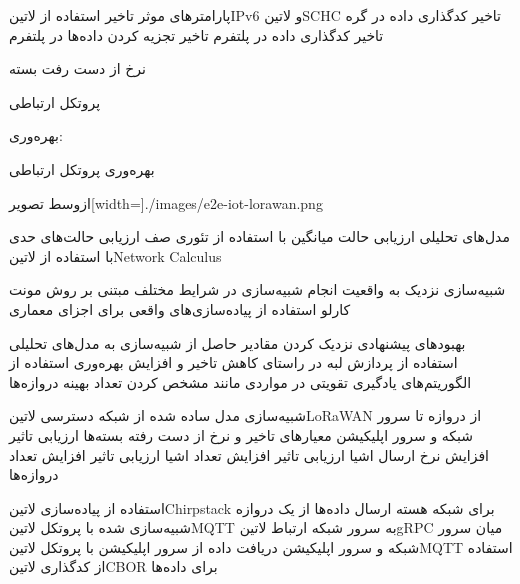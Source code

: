\documentclass[dvipsnames]{beamer}
\begin{document}
\begin{persian}
\begin{frame}{پارامترهای موثر}
	   تاخیر استفاده از ‌لاتین{IPv6} و ‌لاتین{SCHC}
	   تاخیر کدگذاری داده در گره
	   تاخیر کدگذاری داده در پلتفرم
	   تاخیر تجزیه کردن داده‌ها در پلتفرم

	   نرخ از دست رفت بسته

	   پروتکل ارتباطی

	   بهره‌وری:

	   بهره‌وری پروتکل ارتباطی

	\end{frame}

	\begin{frame}{}
	  ‌ازوسط
	  ‌تصویر[width=\textwidth]{./images/e2e-iot-lorawan.png}
	\end{frame}

	\begin{frame}
	   مدل‌های تحلیلی
	   ارزیابی حالت میانگین با استفاده از تئوری صف
	   ارزیابی حالت‌های حدی با استفاده از ‌لاتین{Network Calculus}

	   شبیه‌سازی نزدیک به واقعیت
	   انجام شبیه‌سازی در شرایط مختلف مبتنی بر روش مونت کارلو
	   استفاده از پیاده‌سازی‌های واقعی برای اجزای معماری

	   بهبودهای پیشنهادی
	   نزدیک کردن مقادیر حاصل از شبیه‌سازی به مدل‌های تحلیلی
	   استفاده از پردازش لبه در راستای کاهش تاخیر و افزایش بهره‌وری
	   استفاده از الگوریتم‌های یادگیری تقویتی در مواردی مانند مشخص کردن تعداد بهینه دروازه‌ها
	\end{frame}

	\قسمت{شبیه‌سازی}

	\begin{frame}
	  \شروع{فقرات}
	   شبیه‌سازی مدل ساده شده از شبکه دسترسی ‌لاتین{LoRaWAN} از دروازه تا سرور شبکه و سرور اپلیکیشن
	   معیارهای تاخیر و نرخ از دست رفته بسته‌ها
	   ارزیابی تاثیر افزایش نرخ ارسال اشیا
	   ارزیابی تاثیر افزایش تعداد اشیا
	   ارزیابی تاثیر افزایش تعداد دروازه‌ها
	  \پایان{فقرات}
	\end{frame}

	\begin{frame}
	   استفاده از پیاده‌سازی ‌لاتین{Chirpstack} برای شبکه هسته
	   ارسال داده‌ها از یک دروازه شبیه‌سازی شده با پروتکل ‌لاتین{MQTT} به سرور شبکه
	   ارتباط ‌لاتین{gRPC} میان سرور شبکه و سرور اپلیکیشن
	   دریافت داده از سرور اپلیکیشن با پروتکل ‌لاتین{MQTT}
	   استفاده از کدگذاری ‌لاتین{CBOR} برای داده‌ها
	\end{frame}


\end{persian}
\end{document}
